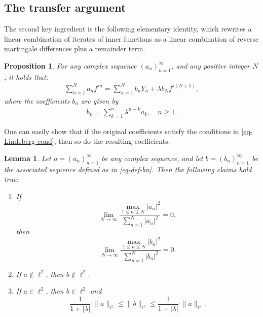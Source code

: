 \documentclass[11pt, reqno]{amsart}
\newtheorem{lemma}[theorem]{Lemma}
\newtheorem{proposition}[theorem]{Proposition}
\theoremstyle{definition}
\newtheorem*{Brown-Eagleson Theorem}{The Brown-Eagleson Theorem}
\begin{document}
		\subsection{The transfer argument}
		
		The second key ingredient is the following elementary identity, which rewrites a linear combination of iterates of inner functions as a linear combination of reverse martingale differences plus a remainder term.


	\begin{proposition}\label{lem-inner=Yn+remainder}
	For any complex sequence $(a_n)_{n=1}^\infty$, and any positive integer $N$, it holds that: 
		\begin{align}\label{eq-sum-to-martingale}
			\sum_{n=1}^N a_n f^{\circ n}=\sum_{n=1}^N b_n Y_n + \lambda b_N f^{\circ (N+1)}, 
		\end{align}
		where the coefficients $b_n$ are given by 
		\begin{align}\label{eq-def-bn}
			b_n=\sum_{k=1}^n \lambda^{n-k} a_k, \quad n\geq 1.
		\end{align}
	\end{proposition}

One can easily show that if the original coefficients satisfy the conditions in \eqref{eq-Lindeberg-cond}, then so do the resulting coefficients:
	
	\begin{lemma}\label{lem-transfer}
		Let $a=(a_n)_{n=1}^\infty$ be any complex sequence, and let $b=(b_n)_{n=1}^\infty$ be the associated sequence defined as in \eqref{eq-def-bn}. Then the following claims hold true: 
		\begin{enumerate}[label=(\roman*),font=\normalfont]
			\item \label{item:keep-Lindberg}If $$\lim_{N\to \infty} \frac{\max_{1\leq n \leq N} |a_n|^2}{\sum_{n=1}^N |a_n|^2} = 0,$$ then $$\lim_{N\to \infty} \frac{\max_{1\leq n \leq N} |b_n|^2}{\sum_{n=1}^N |b_n|^2} =0.$$
			\item \label{item:keep-no-ell2} If $a\notin \ell^2$, then $b\notin \ell^2$.
			\item \label{item:keep-ell2}If $a\in \ell^2$, then $b\in \ell^2$ and $$\frac{1}{1+|\lambda|}\cdot \|a\|_{\ell^2} \leq \|b\|_{\ell^2} \leq \frac{1}{1-|\lambda|}\cdot \|a\|_{\ell^2}.$$
		\end{enumerate}
	\end{lemma}
\end{document}

